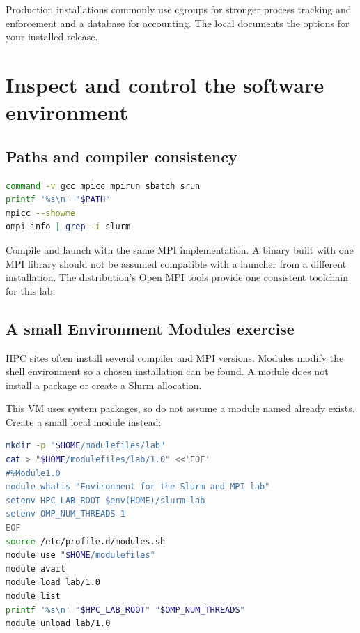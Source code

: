 \documentclass[11pt,a4paper]{article}
\newcommand{\cmd}[1]{\texttt{\detokenize{#1}}}
\begin{document}
Production installations commonly use cgroups for stronger process tracking
and enforcement and a database for accounting. The local \cmd{man slurm.conf}
documents the options for your installed release.\cite{slurm-conf}

\section{Inspect and control the software environment}
\subsection{Paths and compiler consistency}
\par\nobreak
\begin{minipage}{\linewidth}
\begin{lstlisting}[language=bash]
command -v gcc mpicc mpirun sbatch srun
printf '%s\n' "$PATH"
mpicc --showme
ompi_info | grep -i slurm
\end{lstlisting}
\end{minipage}\par

Compile and launch with the same MPI implementation. A binary built with one
MPI library should not be assumed compatible with a launcher from a different
installation. The distribution's Open MPI tools provide one consistent
toolchain for this lab.

\subsection{A small Environment Modules exercise}
HPC sites often install several compiler and MPI versions. Modules modify
the shell environment so a chosen installation can be found. A module does
not install a package or create a Slurm allocation.\cite{modules}

This VM uses system packages, so do not assume a module named
\cmd{openmpi} already exists. Create a small local module instead:
\par\nobreak
\begin{minipage}{\linewidth}
\begin{lstlisting}[language=bash]
mkdir -p "$HOME/modulefiles/lab"
cat > "$HOME/modulefiles/lab/1.0" <<'EOF'
#%Module1.0
module-whatis "Environment for the Slurm and MPI lab"
setenv HPC_LAB_ROOT $env(HOME)/slurm-lab
setenv OMP_NUM_THREADS 1
EOF
source /etc/profile.d/modules.sh
module use "$HOME/modulefiles"
module avail
module load lab/1.0
module list
printf '%s\n' "$HPC_LAB_ROOT" "$OMP_NUM_THREADS"
module unload lab/1.0
\end{lstlisting}
\end{minipage}\par
\end{document}

